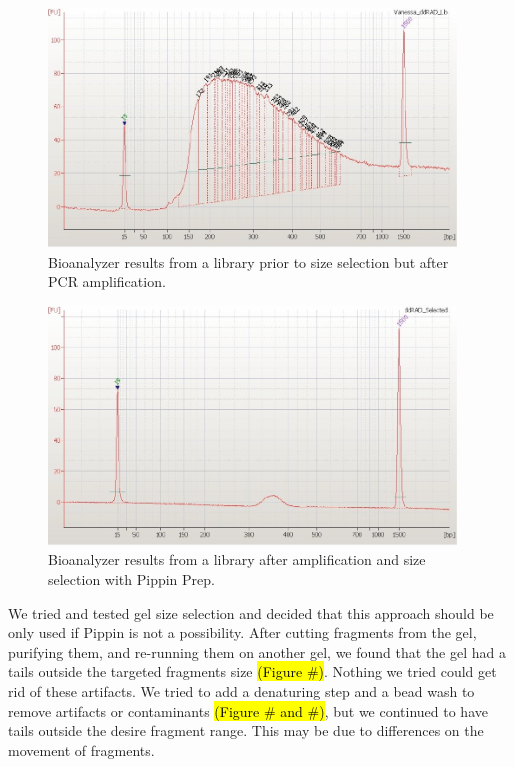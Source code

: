 \documentclass[11pt, oneside]{article}
\begin{document}
			\begin{figure}[h]
				\begin{center}
					\includegraphics[height=2.5in]{./images/afterPCR_Bioanalyzer.pdf}
					\caption{Bioanalyzer results from a library prior to size selection but after PCR amplification.}
				\end{center}
			\end{figure}

			\begin{figure}[h]
				\begin{center}
					\includegraphics[height=2.5in]{./images/afterPippin_Bioanalyzer.pdf}
					\caption{Bioanalyzer results from a library after amplification and size selection with Pippin Prep.}
				\end{center}
			\end{figure}
\clearpage
\newpage

 We tried and tested gel size selection and decided that this approach should be only used if Pippin is not a possibility.  After cutting fragments from the gel, purifying them, and re-running them on another gel, we found that the gel had a tails outside the targeted fragments size \hl{(Figure \#)}.  Nothing we tried could get rid of these artifacts. We tried to add a denaturing step and a bead wash to remove artifacts or contaminants \hl{(Figure \# and \#)}, but we continued to have tails outside the desire fragment 				range. This may be due to differences on the movement of fragments. 
\end{document}
